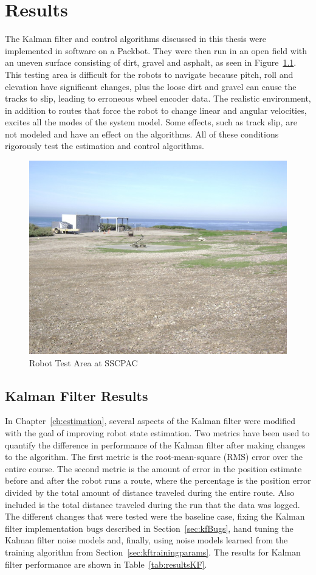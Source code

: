 \chapter{Results}
\label{ch:results}
The Kalman filter and control algorithms discussed in this thesis were implemented in software on a Packbot. They were then run in an open field with an uneven surface consisting of dirt, gravel and asphalt, as seen in Figure~\ref{fig:resultsTestArea}. This testing area is difficult for the robots to navigate because pitch, roll and elevation have significant changes, plus the loose dirt and gravel can cause the tracks to slip, leading to erroneous wheel encoder data. The realistic environment, in addition to routes that force the robot to change linear and angular velocities, excites all the modes of the system model. Some effects, such as track slip, are not modeled and have an effect on the algorithms. All of these conditions rigorously test the estimation and control algorithms.

\begin{figure}[ht!]
\centering
\includegraphics[width=.75\textwidth]{images/flightFieldTestArea}
\caption{Robot Test Area at SSCPAC}
\label{fig:resultsTestArea}
\end{figure}

\section{Kalman Filter Results}
\label{sec:kfResults}
In Chapter~\ref{ch:estimation}, several aspects of the Kalman filter were modified with the goal of improving robot state estimation. Two metrics have been used to quantify the difference in performance of the Kalman filter after making changes to the algorithm. The first metric is the root-mean-square (RMS) error over the entire course. The second metric is the amount of error in the position estimate before and after the robot runs a route, where the percentage is the position error divided by the total amount of distance traveled during the entire route. Also included is the total distance traveled during the run that the data was logged. The different changes that were tested were the baseline case, fixing the Kalman filter implementation bugs described in Section~\ref{sec:kfBugs}, hand tuning the Kalman filter noise models and, finally, using noise models learned from the training algorithm from Section~\ref{sec:kftrainingparams}. The results for Kalman filter performance are shown in Table~\ref{tab:resultsKF}.

